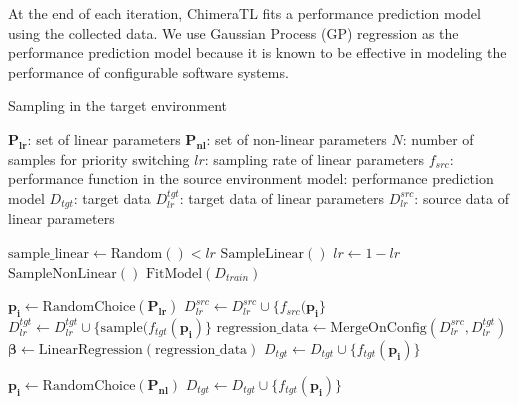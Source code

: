 At the end of each iteration, ChimeraTL fits a performance prediction model using the collected data.
We use Gaussian Process (GP) regression\cite{gp} as the performance prediction model because it is known to be effective in modeling the performance of configurable software systems\cite{l2s,Ottertune,restune,Onlinetune,datareuse}.

\begin{algorithm}\small
  \caption{Sampling in the target environment}
  \label{alg:sampling}
  \begin{algorithmic}[1]
    \Require
      \Statex $\boldsymbol{P_{lr}}$: set of linear parameters
      \Statex $\boldsymbol{P_{nl}}$: set of non-linear parameters
      \Statex $N$: number of samples for priority switching
      \Statex $lr$: sampling rate of linear parameters
      \Statex $f_{src}$: performance function in the source environment
      \Statex $\text{model}$: performance prediction model
    \Ensure 
      \Statex $D_{tgt}$: target data
      \Statex $D_{lr}^{tgt}$: target data of linear parameters
      \Statex $D_{lr}^{src}$: source data of linear parameters
    \Statex

      \State $\text{sample\_linear} \gets \text{Random}() < lr$
        \State $\text{SampleLinear}()$
        \label{alg:sampling:n}
          \State $lr \gets 1 - lr$\label{alg:sampling:lr}
        \EndIf
      \Else
        \State $\text{SampleNonLinear}()$
      \EndIf
      \State $\text{FitModel}(D_{train})$
    \EndFunction

    \State

    \label{alg:sampling:regression}
      \State $\boldsymbol{p_i} \gets \text{RandomChoice}(\boldsymbol{P_{lr}})$
      \State $D_{lr}^{src} \gets D_{lr}^{src} \cup \{f_{src}(\boldsymbol{p_i}\}$
      \State $D_{lr}^{tgt} \gets D_{lr}^{tgt} \cup \{\text{sample}(f_{tgt}(\boldsymbol{p_i})\}$
      \State $\text{regression\_data} \gets \text{MergeOnConfig}(D_{lr}^{src}, D_{lr}^{tgt})$
      \State $\boldsymbol{\beta} \gets \text{LinearRegression}(\text{regression\_data})$
      \State $D_{tgt} \gets D_{tgt} \cup \{f_{tgt}(\boldsymbol{p_i})\}$
    \EndFunction

    \State

      \State $\boldsymbol{p_i} \gets \text{RandomChoice}(\boldsymbol{P_{nl}})$
      \State $D_{tgt} \gets D_{tgt} \cup \{f_{tgt}(\boldsymbol{p_i})\}$
    \EndFunction


\end{algorithmic}
\end{algorithm}
